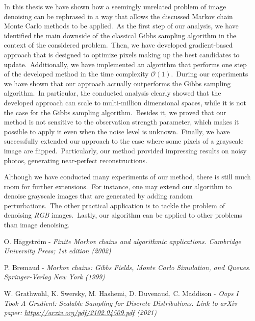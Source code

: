 \documentclass[shortabstract, english, lic]{iithesis}
\theoremstyle{default_theorem_style}\newtheorem{theorem}{Theorem}
\theoremstyle{default_theorem_style}\newtheorem{definition}{Definition}
\begin{document}
In this thesis we have shown how a seemingly unrelated
problem of image denoising can be rephrased in a way that allows the discussed Markov chain Monte Carlo methods to be
applied.\ As the first step of our analysis, we have identified the main downside of the classical Gibbs sampling
algorithm in the context of the considered problem.\ Then, we have developed gradient-based approach that is designed
to optimize pixels making up the best candidates to update.\ Additionally, we have implemented an algorithm that
performs one step of the developed method in the time complexity $\mathcal{O}(1)$.\ During our experiments we have
shown that our approach actually outperforms the Gibbs sampling algorithm.\ In particular, the conducted analysis
clearly showed that the developed approach can scale to multi-million dimensional spaces, while it is not the case for
the Gibbs sampling algorithm.\ Besides it, we proved that our method is not sensitive to the observation strength
parameter, which makes it possible to apply it even when the noise level is unknown.\ Finally, we have
successfully extended our approach to the case where some pixels of a grayscale image are flipped.\ Particularly,
our method provided impressing results on noisy photos, generating near-perfect reconstructions.\newline

\noindent Although we have conducted many experiments of our method, there is still much room for further
extensions.\ For instance, one may extend our algorithm to denoise grayscale images that are
generated by adding random perturbations.\ The other practical application is to tackle the problem of
denoising \textit{RGB} images.\ Lastly, our algorithm can be applied to other problems than image denoising.


\begin{thebibliography}{9}

O. Häggström - \textit{Finite Markov chains and algorithmic applications. Cambridge University
Press; 1st edition (2002)}

P. Bremaud - \textit{Markov chains: Gibbs Fields, Monte Carlo Simulation, and Queues. Springer-Verlag New
York (1999)}

W. Grathwohl, K. Swersky, M. Hashemi, D. Duvenaud, C. Maddison -
\textit{Oops I Took A Gradient: Scalable Sampling for Discrete Distributions. Link to arXiv paper:
\url{https://arxiv.org/pdf/2102.04509.pdf} (2021)}

\end{thebibliography}
\end{document}
